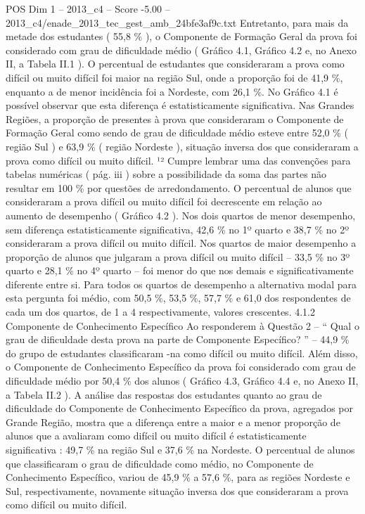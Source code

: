 \begin{textsample}{POS Dim 1 – 2013\_c4 – Score -5.00 – 2013\_c4/enade\_2013\_tec\_gest\_amb\_24bfe3af9c.txt}
Entretanto, para mais da metade dos estudantes ( 55,8 \% ), o Componente de Formação Geral da prova foi considerado com grau de dificuldade médio ( Gráfico 4.1, Gráfico 4.2 e, no Anexo II, a Tabela II.1 ).
O percentual de estudantes que consideraram a prova como difícil ou muito difícil foi maior na região Sul, onde a proporção foi de 41,9 \%, enquanto a de menor incidência foi a Nordeste, com 26,1 \%.
No Gráfico 4.1 é possível observar que esta diferença é estatisticamente significativa.
Nas Grandes Regiões, a proporção de presentes à prova que consideraram o Componente de Formação Geral como sendo de grau de dificuldade médio esteve entre 52,0 \% ( região Sul ) e 63,9 \% ( região Nordeste ), situação inversa dos que consideraram a prova como difícil ou muito difícil. ¹² Cumpre lembrar uma das convenções para tabelas numéricas ( pág. iii ) sobre a possibilidade da soma das partes não resultar em 100 \% por questões de arredondamento.
O percentual de alunos que consideraram a prova difícil ou muito difícil foi decrescente em relação ao aumento de desempenho ( Gráfico 4.2 ).
Nos dois quartos de menor desempenho, sem diferença estatisticamente significativa, 42,6 \% no 1º quarto e 38,7 \% no 2º consideraram a prova difícil ou muito difícil.
Nos quartos de maior desempenho a proporção de alunos que julgaram a prova difícil ou muito difícil – 33,5 \% no 3º quarto e 28,1 \% no 4º quarto – foi menor do que nos demais e significativamente diferente entre si.
Para todos os quartos de desempenho a alternativa modal para esta pergunta foi médio, com 50,5 \%, 53,5 \%, 57,7 \% e 61,0 dos respondentes de cada um dos quartos, de 1 a 4 respectivamente, valores crescentes. 4.1.2 Componente de Conhecimento Específico Ao responderem à Questão 2 – “ Qual o grau de dificuldade desta prova na parte de Componente Específico? ” – 44,9 \% do grupo de estudantes classificaram -na como difícil ou muito difícil.
Além disso, o Componente de Conhecimento Específico da prova foi considerado com grau de dificuldade médio por 50,4 \% dos alunos ( Gráfico 4.3, Gráfico 4.4 e, no Anexo II, a Tabela II.2 ).
A análise das respostas dos estudantes quanto ao grau de dificuldade do Componente de Conhecimento Específico da prova, agregados por Grande Região, mostra que a diferença entre a maior e a menor proporção de alunos que a avaliaram como difícil ou muito difícil é estatisticamente significativa : 49,7 \% na região Sul e 37,6 \% na Nordeste.
O percentual de alunos que classificaram o grau de dificuldade como médio, no Componente de Conhecimento Específico, variou de 45,9 \% a 57,6 \%, para as regiões Nordeste e Sul, respectivamente, novamente situação inversa dos que consideraram a prova como difícil ou muito difícil.

\end{textsample}
